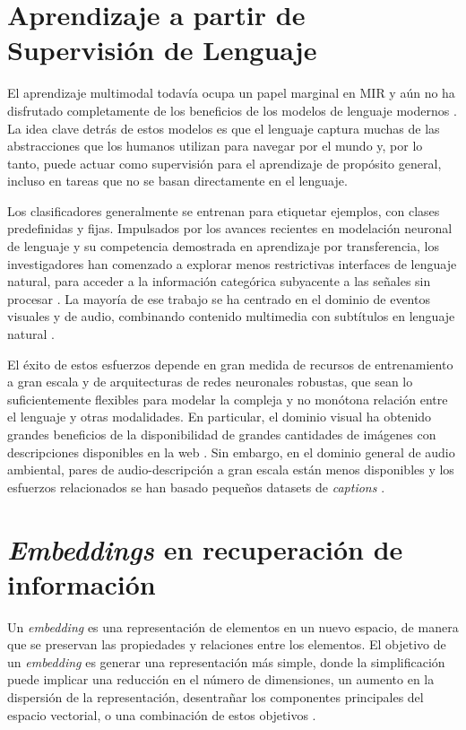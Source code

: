 \section{Aprendizaje a partir de Supervisión de Lenguaje}
\label{sec:learning_lang_superv}

El aprendizaje multimodal todavía ocupa un papel marginal en MIR y aún no ha disfrutado completamente de los beneficios de los modelos de lenguaje modernos \cite{Manco2022ContrastiveAL}. La idea clave detrás de estos modelos es que el lenguaje captura muchas de las abstracciones que los humanos utilizan para navegar por el mundo y, por lo tanto, puede actuar como supervisión para el aprendizaje de propósito general, incluso en tareas que no se basan directamente en el lenguaje.

Los clasificadores generalmente se entrenan para etiquetar ejemplos, con clases predefinidas y fijas. Impulsados por los avances recientes en modelación neuronal de lenguaje y su competencia demostrada en aprendizaje por transferencia, los investigadores han comenzado a explorar menos restrictivas interfaces de lenguaje natural, para acceder a la información categórica subyacente a las señales sin procesar \cite{Huang2022MuLanAJ}. La mayoría de ese trabajo se ha centrado en el dominio de eventos visuales y de audio, combinando contenido multimedia con subtítulos en lenguaje natural \cite{Koepke2021AudioRW, Jia2021ScalingUV, Radford2021LearningTV, Nagrani2022LearningAM}.

El éxito de estos esfuerzos depende en gran medida de recursos de entrenamiento a gran escala y de arquitecturas de redes neuronales robustas, que sean lo suficientemente flexibles para modelar la compleja y no monótona relación entre el lenguaje y otras modalidades. En particular, el dominio visual ha obtenido grandes beneficios de la disponibilidad de grandes cantidades de imágenes con descripciones disponibles en la web \cite{Jia2021ScalingUV}. Sin embargo, en el dominio general de audio ambiental, pares de audio-descripción a gran escala están menos disponibles y los esfuerzos relacionados se han basado pequeños datasets de \textit{captions} \cite{Drossos2019ClothoAA, Kim2019AudioCapsGC}.

\section{\textit{Embeddings} en recuperación de información}
\label{sec:semantic_embedd}

Un \textit{embedding} es una representación de elementos en un nuevo espacio, de manera que se preservan las propiedades y relaciones entre los elementos. El objetivo de un \textit{embedding} es generar una representación más simple, donde la simplificación puede implicar una reducción en el número de dimensiones, un aumento en la dispersión de la representación, desentrañar los componentes principales del espacio vectorial, o una combinación de estos objetivos \cite{Mitra2017NeuralMF}.

